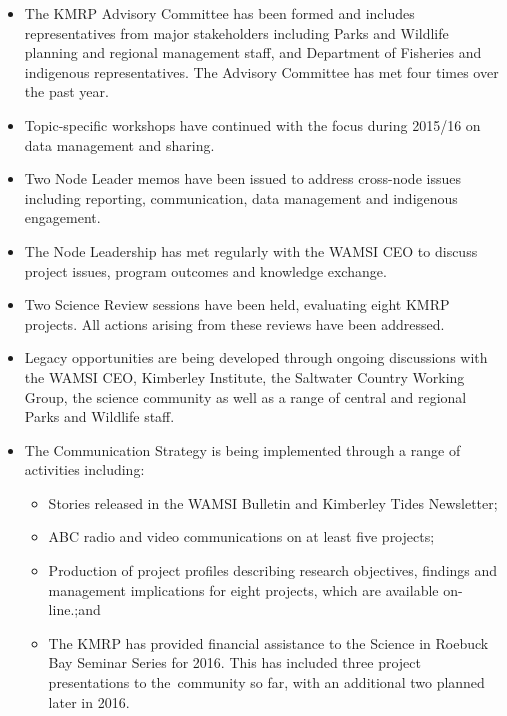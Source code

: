 \documentclass[version=last,
    paper=a4, %
    10pt, %
    usenames,
    dvipsnames,
    oneside, %
    headings=openany, %
    DIV=15 %
]{scrbook}
\begin{document}
\begin{itemize}
  \begin{itemize}
  \itemsep1pt\parskip0pt
  \item
    The KMRP Advisory Committee has been formed and includes
    representatives from major stakeholders including Parks and Wildlife
    planning and regional management staff, and Department of Fisheries
    and indigenous representatives. The Advisory Committee has met four
    times over the past year.
  \item
    Topic-specific workshops have continued with the focus during
    2015/16 on data management and sharing.
  \item
    Two Node Leader memos have been issued to address cross-node issues
    including reporting, communication, data management and indigenous
    engagement.
  \item
    The Node Leadership has met regularly with the WAMSI CEO to discuss
    project issues, program outcomes and knowledge exchange.
  \item
    Two Science Review sessions have been held, evaluating eight KMRP
    projects. All actions arising from these reviews have been
    addressed.
  \item
    Legacy opportunities are being developed through ongoing discussions
    with the WAMSI CEO, Kimberley Institute, the Saltwater Country
    Working Group, the science community as well as a range of central
    and regional Parks and Wildlife staff.
  \item
    The Communication Strategy is being implemented through a range of
    activities including:

    \begin{itemize}
    \itemsep1pt\parskip0pt
    \item
      Stories released in the WAMSI Bulletin and Kimberley Tides
      Newsletter;
    \item
      ABC radio and video communications on at least five projects;
    \item
      Production of project profiles describing research objectives,
      findings and management implications for eight projects, which are
      available on-line.;and
    \item
      The KMRP has provided financial assistance to the Science in
      Roebuck Bay Seminar Series for 2016. This has included three
      project presentations to the~community so far, with an additional
      two planned later in 2016. ~ ~ ~ ~ ~ ~ ~ ~ ~ ~ ~ ~~
    \end{itemize}
  \end{itemize}
\end{itemize}
\end{document}
